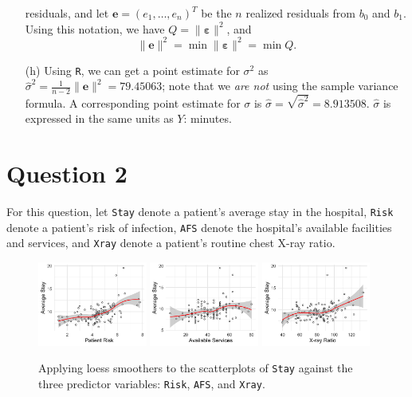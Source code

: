 \documentclass[10pt]{article}
\begin{document}
\begin{itemize}
    residuals, and let \(\mathbf{e} = (e_1, \ldots, e_n)^T\) be the \(n\) realized residuals from \(b_0\)
    and \(b_1\). Using this 
    notation, we have \(Q = \| \bm{\varepsilon} \|^2\), and \[\| \mathbf{e}\|^2 = \min \|\bm{\varepsilon}\|^2 = \min Q.\]
    \item[(h)] Using \texttt{R}, we can get a point estimate for \(\sigma^2\) as \(\hat{\sigma}^2 = \frac{1}{n-2} \|\mathbf{e}\|^2 = 79.45063\); note that we 
    \textit{are not} using the sample variance formula. A corresponding point estimate for \(\sigma\) is \(\hat{\sigma} = \sqrt{\hat{\sigma}^2} = 8.913508\). 
    \(\hat{\sigma}\) is expressed in the same units as \(Y\): minutes. 

\end{itemize}

\section{Question 2} \noindent
For this question, let \texttt{Stay} denote a patient's average stay in the hospital, \texttt{Risk} denote a patient's risk of infection, \texttt{AFS} 
denote the hospital's available facilities and services, and \texttt{Xray} denote a patient's routine chest X-ray ratio. 
\begin{figure}[ht]
    \includegraphics[width = 0.32\textwidth]{img/q02-loess1.png}
    \includegraphics[width = 0.32\textwidth]{img/q02-loess2.png}
    \includegraphics[width = 0.32\textwidth]{img/q02-loess3.png}
    \caption{Applying loess smoothers to the scatterplots of \texttt{Stay} against the three predictor variables: \texttt{Risk}, \texttt{AFS}, and 
    \texttt{Xray}.}
    \label{q02-fig01}
\end{figure}
\end{document}
